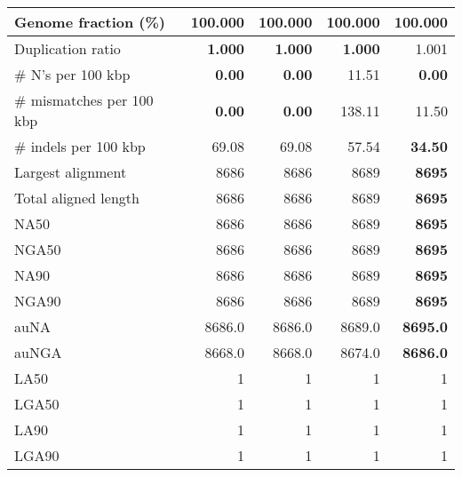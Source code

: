 \documentclass[12pt,a4paper]{article}
\begin{document}
\begin{table}[ht]
\begin{center}
\begin{tabular}{|l*{4}{|r}|}
Genome fraction (\%) & 100.000 & 100.000 & 100.000 & 100.000 \\ \hline
Duplication ratio & {\bf 1.000} & {\bf 1.000} & {\bf 1.000} & 1.001 \\ \hline
\# N's per 100 kbp & {\bf 0.00} & {\bf 0.00} & 11.51 & {\bf 0.00} \\ \hline
\# mismatches per 100 kbp & {\bf 0.00} & {\bf 0.00} & 138.11 & 11.50 \\ \hline
\# indels per 100 kbp & 69.08 & 69.08 & 57.54 & {\bf 34.50} \\ \hline
Largest alignment & 8686 & 8686 & 8689 & {\bf 8695} \\ \hline
Total aligned length & 8686 & 8686 & 8689 & {\bf 8695} \\ \hline
NA50 & 8686 & 8686 & 8689 & {\bf 8695} \\ \hline
NGA50 & 8686 & 8686 & 8689 & {\bf 8695} \\ \hline
NA90 & 8686 & 8686 & 8689 & {\bf 8695} \\ \hline
NGA90 & 8686 & 8686 & 8689 & {\bf 8695} \\ \hline
auNA & 8686.0 & 8686.0 & 8689.0 & {\bf 8695.0} \\ \hline
auNGA & 8668.0 & 8668.0 & 8674.0 & {\bf 8686.0} \\ \hline
LA50 & 1 & 1 & 1 & 1 \\ \hline
LGA50 & 1 & 1 & 1 & 1 \\ \hline
LA90 & 1 & 1 & 1 & 1 \\ \hline
LGA90 & 1 & 1 & 1 & 1 \\ \hline
\end{tabular}
\end{center}
\end{table}
\end{document}
